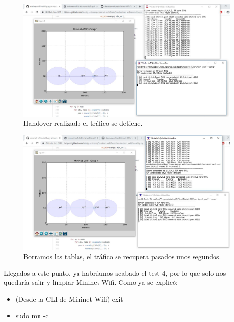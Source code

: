 \begin{figure}[!htb]
  \centering
    \includegraphics[width=\linewidth]{./img/26.JPG}
    \caption{Handover realizado el tráfico se detiene.}
  \label{fig:yo}
\end{figure}
\newpage
\begin{figure}[!htb]
  \centering
    \includegraphics[width=\linewidth]{./img/27.JPG}
    \caption{Borramos las tablas, el tráfico se recupera pasados unos segundos.}
  \label{fig:yo}
\end{figure}
Llegados a este punto, ya habríamos acabado el test 4, por lo que solo nos quedaría salir y limpiar Mininet-Wifi. Como ya se explicó:
\begin{itemize}
    \item (Desde la CLI de Mininet-Wifi) exit
    \item  sudo mn -c
\end{itemize}


